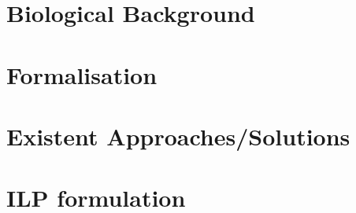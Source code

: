 \section{Biological Background}
\section{Formalisation}
\section{Existent Approaches/Solutions}
\section{ILP formulation}